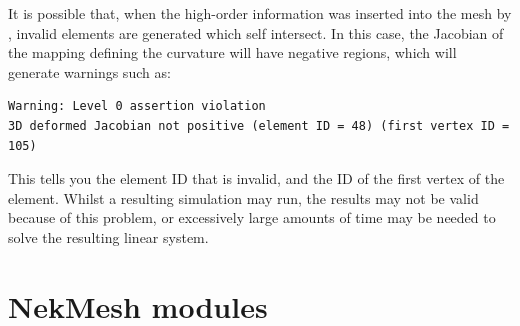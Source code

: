 It is possible that, when the high-order information was inserted into the mesh
by \gmsh, invalid elements are generated which self intersect. In this case, the
Jacobian of the mapping defining the curvature will have negative regions, which
will generate warnings such as:
\begin{lstlisting}[style=BashInputStyle]
Warning: Level 0 assertion violation
3D deformed Jacobian not positive (element ID = 48) (first vertex ID = 105)
\end{lstlisting}
This tells you the element ID that is invalid, and the ID of the first vertex of
the element. Whilst a resulting simulation may run, the results may not be valid
because of this problem, or excessively large amounts of time may be needed to
solve the resulting linear system.

\section{NekMesh modules}

